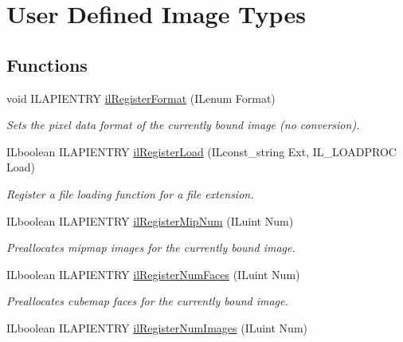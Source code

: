 \hypertarget{group__register}{\section{User Defined Image Types}
\label{group__register}
}
\subsection*{Functions}
\begin{DoxyCompactItemize}
\item 
void I\+L\+A\+P\+I\+E\+N\+T\+R\+Y \hyperlink{group__register_gab16decaa97a48109c9decee6eaa65d2b}{il\+Register\+Format} (I\+Lenum Format)
\begin{DoxyCompactList}\small\item\em Sets the pixel data format of the currently bound image (no conversion). \end{DoxyCompactList}\item 
\hypertarget{group__register_ga187276b36d61a040c08efdb6350b4824}{I\+Lboolean I\+L\+A\+P\+I\+E\+N\+T\+R\+Y \hyperlink{group__register_ga187276b36d61a040c08efdb6350b4824}{il\+Register\+Load} (I\+Lconst\+\_\+string Ext, I\+L\+\_\+\+L\+O\+A\+D\+P\+R\+O\+C Load)}\label{group__register_ga187276b36d61a040c08efdb6350b4824}

\begin{DoxyCompactList}\small\item\em Register a file loading function for a file extension. \end{DoxyCompactList}\item 
\hypertarget{group__register_ga7908a7a8f4b3544b76411300e1059bc9}{I\+Lboolean I\+L\+A\+P\+I\+E\+N\+T\+R\+Y \hyperlink{group__register_ga7908a7a8f4b3544b76411300e1059bc9}{il\+Register\+Mip\+Num} (I\+Luint Num)}\label{group__register_ga7908a7a8f4b3544b76411300e1059bc9}

\begin{DoxyCompactList}\small\item\em Preallocates mipmap images for the currently bound image. \end{DoxyCompactList}\item 
\hypertarget{group__register_ga309eed368a7585dfaa12ed096d2fcef5}{I\+Lboolean I\+L\+A\+P\+I\+E\+N\+T\+R\+Y \hyperlink{group__register_ga309eed368a7585dfaa12ed096d2fcef5}{il\+Register\+Num\+Faces} (I\+Luint Num)}\label{group__register_ga309eed368a7585dfaa12ed096d2fcef5}

\begin{DoxyCompactList}\small\item\em Preallocates cubemap faces for the currently bound image. \end{DoxyCompactList}\item 
\hypertarget{group__register_ga0b3448c79f53f70b5716bab4b82a45cb}{I\+Lboolean I\+L\+A\+P\+I\+E\+N\+T\+R\+Y \hyperlink{group__register_ga0b3448c79f53f70b5716bab4b82a45cb}{il\+Register\+Num\+Images} (I\+Luint Num)}\label{group__register_ga0b3448c79f53f70b5716bab4b82a45cb}


\end{DoxyCompactItemize}
